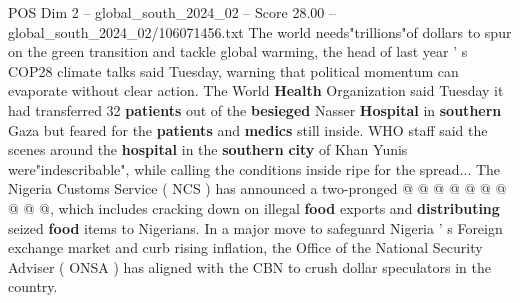 \begin{textsample}{POS Dim 2 – global\_south\_2024\_02 – Score 28.00 – global\_south\_2024\_02/106071456.txt}
The world needs"trillions"of dollars to spur on the green transition and tackle global warming, the head of last year ' s COP28 climate talks said Tuesday, warning that political momentum can evaporate without clear action.
The World \textbf{Health} Organization said Tuesday it had transferred 32 \textbf{patients} out of the \textbf{besieged} Nasser \textbf{Hospital} in \textbf{southern} Gaza but feared for the \textbf{patients} and \textbf{medics} still inside.
WHO staff said the scenes around the \textbf{hospital} in the \textbf{southern} \textbf{city} of Khan Yunis were"indescribable", while calling the conditions inside ripe for the spread...
The Nigeria Customs Service ( NCS ) has announced a two-pronged @ @ @ @ @ @ @ @ @ @, which includes cracking down on illegal \textbf{food} exports and \textbf{distributing} seized \textbf{food} items to Nigerians.
In a major move to safeguard Nigeria ' s Foreign exchange market and curb rising inflation, the Office of the National Security Adviser ( ONSA ) has aligned with the CBN to crush dollar speculators in the country.

\end{textsample}
